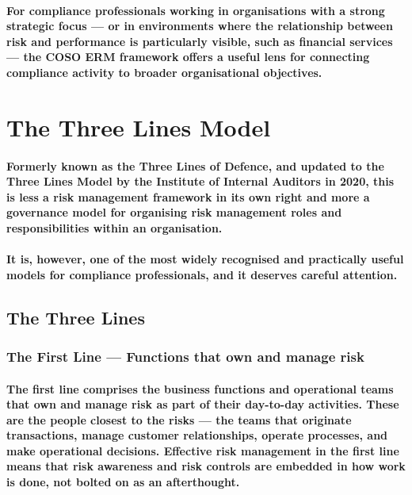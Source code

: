 \paragraph{For compliance professionals working in organisations with a strong strategic focus — or in environments where the relationship between risk and performance is particularly visible, such as financial services — the COSO ERM framework offers a useful lens for connecting compliance activity to broader organisational objectives.}

\section{The Three Lines Model}
\paragraph{Formerly known as the \textbf{Three Lines of Defence}, and updated to the \textbf{Three Lines Model} by the Institute of Internal Auditors in 2020, this is less a risk management framework in its own right and more a \textbf{governance model} for organising risk management roles and responsibilities within an organisation.}
\paragraph{It is, however, one of the most widely recognised and practically useful models for compliance professionals, and it deserves careful attention.}
\subsection{The Three Lines}
\subsubsection{The First Line — Functions that own and manage risk}
\paragraph{The first line comprises the business functions and operational teams that own and manage risk as part of their day-to-day activities. These are the people closest to the risks — the teams that originate transactions, manage customer relationships, operate processes, and make operational decisions. Effective risk management in the first line means that risk awareness and risk controls are embedded in how work is done, not bolted on as an afterthought.}
